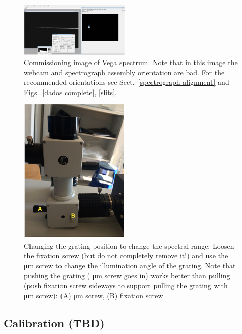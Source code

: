 \documentclass[a4paper, 11pt, fleqn]{memoir}
\begin{document}
\begin{figure}[t!]
    \centering
    \includegraphics[width=0.47\textwidth]{spectrum}
    \caption{Commissioning image of Vega spectrum. \newline Note that in this image the webcam and spectrograph assembly orientation are bad.
        For the recommended orientations see Sect.~\ref{spectrograph alignment} and Figs.~\ref{dados complete}, \ref{slits}.
    }
    \label{spectrum}
\end{figure}

\begin{figure}[t!]
    \centering
    \includegraphics[width=0.47\textwidth]{dados-grid-position}
    \caption{Changing the grating position to change the spectral range:  \newline Loosen the fixation screw (but do not completely remove it!) and use the
        \si{\um} screw to change the illumination angle of the grating.
        Note that pushing the grating (
        \si{\um} screw goes in) works better than pulling (push fixation screw sideways to support pulling the grating with
        \si{\um} screw): \newline (A)
        \si{\um} screw, (B) fixation screw } \label{grid-position}
\end{figure}

\subsection{Calibration (TBD)}
\end{document}

